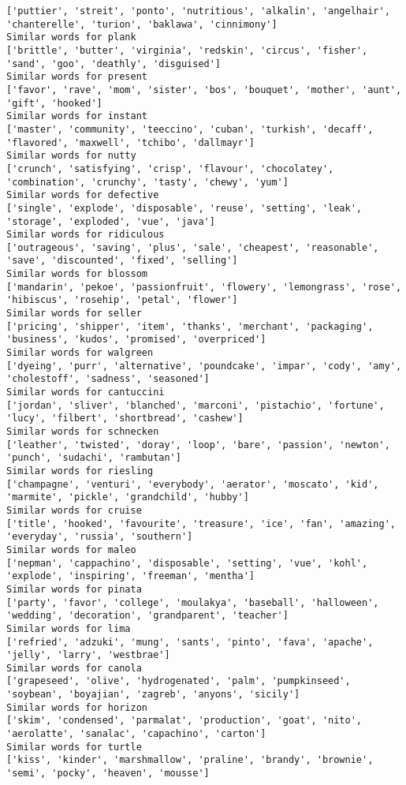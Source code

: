 \documentclass[11pt]{article}
\begin{document}
\begin{Verbatim}[commandchars=\\\{\}]
['puttier', 'streit', 'ponto', 'nutritious', 'alkalin', 'angelhair', 'chanterelle', 'turion', 'baklawa', 'cinnimony']
Similar words for plank
['brittle', 'butter', 'virginia', 'redskin', 'circus', 'fisher', 'sand', 'goo', 'deathly', 'disguised']
Similar words for present
['favor', 'rave', 'mom', 'sister', 'bos', 'bouquet', 'mother', 'aunt', 'gift', 'hooked']
Similar words for instant
['master', 'community', 'teeccino', 'cuban', 'turkish', 'decaff', 'flavored', 'maxwell', 'tchibo', 'dallmayr']
Similar words for nutty
['crunch', 'satisfying', 'crisp', 'flavour', 'chocolatey', 'combination', 'crunchy', 'tasty', 'chewy', 'yum']
Similar words for defective
['single', 'explode', 'disposable', 'reuse', 'setting', 'leak', 'storage', 'exploded', 'vue', 'java']
Similar words for ridiculous
['outrageous', 'saving', 'plus', 'sale', 'cheapest', 'reasonable', 'save', 'discounted', 'fixed', 'selling']
Similar words for blossom
['mandarin', 'pekoe', 'passionfruit', 'flowery', 'lemongrass', 'rose', 'hibiscus', 'rosehip', 'petal', 'flower']
Similar words for seller
['pricing', 'shipper', 'item', 'thanks', 'merchant', 'packaging', 'business', 'kudos', 'promised', 'overpriced']
Similar words for walgreen
['dyeing', 'purr', 'alternative', 'poundcake', 'impar', 'cody', 'amy', 'cholestoff', 'sadness', 'seasoned']
Similar words for cantuccini
['jordan', 'sliver', 'blanched', 'marconi', 'pistachio', 'fortune', 'lucy', 'filbert', 'shortbread', 'cashew']
Similar words for schnecken
['leather', 'twisted', 'doray', 'loop', 'bare', 'passion', 'newton', 'punch', 'sudachi', 'rambutan']
Similar words for riesling
['champagne', 'venturi', 'everybody', 'aerator', 'moscato', 'kid', 'marmite', 'pickle', 'grandchild', 'hubby']
Similar words for cruise
['title', 'hooked', 'favourite', 'treasure', 'ice', 'fan', 'amazing', 'everyday', 'russia', 'southern']
Similar words for maleo
['nepman', 'cappachino', 'disposable', 'setting', 'vue', 'kohl', 'explode', 'inspiring', 'freeman', 'mentha']
Similar words for pinata
['party', 'favor', 'college', 'moulakya', 'baseball', 'halloween', 'wedding', 'decoration', 'grandparent', 'teacher']
Similar words for lima
['refried', 'adzuki', 'mung', 'sants', 'pinto', 'fava', 'apache', 'jelly', 'larry', 'westbrae']
Similar words for canola
['grapeseed', 'olive', 'hydrogenated', 'palm', 'pumpkinseed', 'soybean', 'boyajian', 'zagreb', 'anyons', 'sicily']
Similar words for horizon
['skim', 'condensed', 'parmalat', 'production', 'goat', 'nito', 'aerolatte', 'sanalac', 'capachino', 'carton']
Similar words for turtle
['kiss', 'kinder', 'marshmallow', 'praline', 'brandy', 'brownie', 'semi', 'pocky', 'heaven', 'mousse']

\end{Verbatim}
\end{document}
